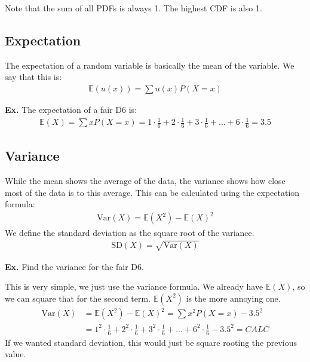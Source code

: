 \documentclass[12pt,letterpaper]{article} \usepackage{amsmath} \usepackage{graphicx} \usepackage[margin=1in]{geometry} \usepackage{longtable}  \usepackage{amssymb}
\begin{document}
	Note that the sum of all PDFs is always 1. The highest CDF is also 1. 
	
	\subsection{Expectation}
	The expectation of a random variable is basically the mean of the variable. We say that this is:
	\begin{align*}
		\mathbb E (u(x)) = \sum u(x)P(X=x)
	\end{align*}

	\begin{mdframed}
		\textbf{Ex. } The expectation of a fair D6 is:
		\begin{align*}
			\mathbb E (X) = \sum xP(X=x) = 1\cdot\frac{1}{6} + 2\cdot \frac{1}{6} + 3\cdot \frac{1}{6} + ... + 6\cdot \frac{1}{6} = 3.5
		\end{align*}
	\end{mdframed}
	
	\subsection{Variance}
	While the mean shows the average of the data, the variance shows how close most of the data is to this average. This can be calculated using the expectation formula:
	\begin{align*}
		\text{Var}(X) = \mathbb E (X^2) - \mathbb E(X)^2
	\end{align*}
	We define the standard deviation as the square root of the variance. 
	\begin{align*}
		\text{SD}(X) = \sqrt{\text{Var}(X)}
	\end{align*}

	\begin{mdframed}
		\textbf{Ex.} Find the variance for the fair D6.
		
		This is very simple, we just use the variance formula. We already have $\mathbb E(X)$, so we can square that for the second term. $\mathbb E(X^2)$ is the more annoying one. 
		\begin{align*}
			\text{Var}(X) &= \mathbb E (X^2) - \mathbb E(X)^2 = \sum x^2 P(X=x) - 3.5^2\\
			&= 1^2 \cdot \frac{1}{6} + 2^2 \cdot \frac{1}{6} + 3^2 \cdot \frac{1}{6} + ... + 6^2 \cdot \frac{1}{6} - 3.5^2 = CALC
		\end{align*}
	If we wanted standard deviation, this would just be square rooting the previous value. 
	\end{mdframed}
	
\end{document}
